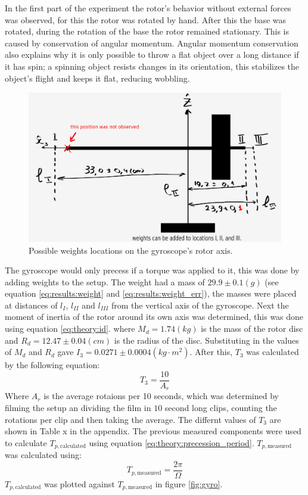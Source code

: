 \begin{multicols}{2}
In the first part of the experiment the rotor’s behavior without external forces was observed, for this the rotor was rotated by hand. After this the base was rotated, during the rotation of the base the rotor remained stationary. This is caused by conservation of angular momentum. Angular momentum conservation also explains why it is only possible to throw a flat object over a long distance if it has spin; a spinning object resists changes in its orientation, this stabilizes the object's flight and keeps it flat, reducing wobbling.
\begin{figure}[H]
  \centering
  \includegraphics[width=\columnwidth]{gyroscope/images/locs}
  \caption{Possible weights locations on the gyroscope's rotor axis. }
  \label{fig:results:locs}
\end{figure}

The gyroscope would only precess if a torque was applied to it, this was done by adding weights to the setup. The weight had a mass of $29.9 \pm 0.1 (g)$ (see equation \ref{eq:results:weight} and \ref{eq:results:weight_err}), the masses were placed at distances of $l_{I}$, $l_{II}$ and $l_{III}$ from the vertical axis of the gyroscope.
Next the moment of inertia of the rotor around its own axis was determined, this was done using equation \ref{eq:theory:id}.
where $M_d = 1.74 (kg)$ is the mass of the rotor disc and $R_d = 12.47 \pm 0.04 (cm)$ is the radius of the disc. Substituting in the values of $M_d$ and $R_d$ gave $I_3 = 0.0271 \pm 0.0004 (kg \cdot m^2)$. After this, $T_3$ was calculated by the following equation:
\begin{equation*}
    T_3 = \frac{10}{A_{r}}
\end{equation*}
Where $A_{r}$ is the average rotaions per 10 seconds, which was determined by filming the setup an dividing the film in $10$ second long clips, counting the rotations per clip and then taking the average. The differnt values of $T_3$ are shown in Table x in the appendix. The previous measured components were used to calculate $T_{p, \text{calculated}}$ using equation \ref{eq:theory:precession_period}. $T_{p, \text{measured}}$ was calculated using:
\begin{equation*}
    T_{p, \text{measured}} = \frac{2\pi}{\Omega}
\end{equation*}
$T_{p, \text{calculated}}$ was plotted against $T_{p, \text{measured}}$ in figure \ref{fig:gyro}.


\end{multicols}
